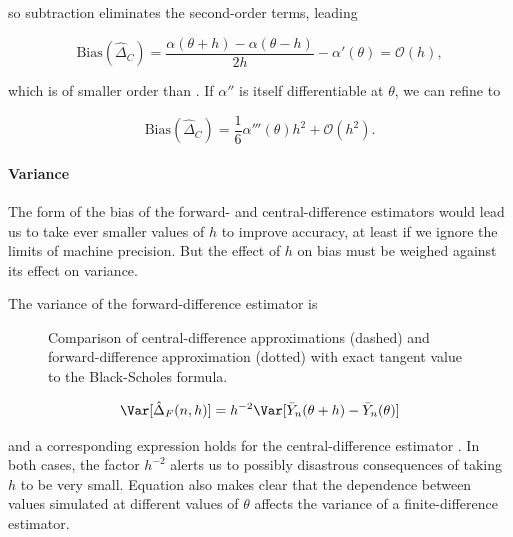 so subtraction eliminates the second-order terms, leading

\begin{equation}
	\text{Bias} (\hat{\Delta}_C) = \frac{\alpha(\theta+h) - \alpha(\theta-h)}{2h} - \alpha'(\theta) = \mathcal{O}(h),
	\label{eq:CentralDiffBias}
\end{equation}

which is of smaller order than . If \(\alpha''\) is itself differentiable at \(\theta\), we can refine  to

\begin{equation}
	\text{Bias} (\hat{\Delta}_C) = \frac{1}{6} \alpha'''(\theta)h^2 + \mathcal{O}(h^2).
	\label{eq:CentralDiffBiasOrder}
\end{equation}

\paragraph{Variance}

The form of the bias of the forward- and central-difference estimators would lead us to take ever smaller values of \(h\) to improve accuracy, at least if we ignore the limits of machine precision. But the effect of \(h\) on bias must be weighed against its effect on variance.

The variance of the forward-difference estimator  is

\begin{figure}[H]
	\centering
	
	\caption{Comparison of central-difference approximations (dashed) and forward-difference approximation (dotted) with exact tangent value to the Black-Scholes formula.}
	\label{fig:finiteDifference}
\end{figure}

\begin{equation} \label{eq:VarianceOfFiniteDifferenceEstimator}
	\Var[\hat{\Delta}_F(n,h)] = h^{-2}\Var [\bar{Y}_n(\theta + h) - \bar{Y}_n(\theta)]
\end{equation}

and a corresponding expression holds for the central-difference estimator .
In both cases, the factor \(h^{-2}\) alerts us to possibly disastrous consequences of
taking \(h\) to be very small. Equation  also makes clear that the dependence
between values simulated at different values of \(\theta\) affects the variance of a finite-difference
estimator.

